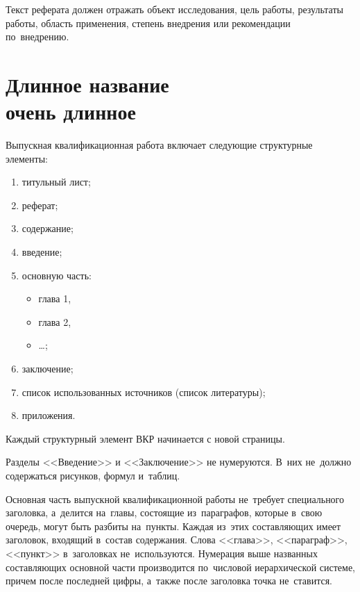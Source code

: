 \documentclass[a4paper,12pt]{diplom}
\begin{document}
Текст реферата должен отражать объект исследования, цель работы, результаты работы, область применения, степень внедрения или рекомендации по~внедрению.

\tableofcontents[Содержание]


\chapter[Длинное название очень длинное]{Длинное название \\ очень длинное}





Выпускная квалификационная работа включает следующие структурные элементы:
\begin{enumerate}[label=\arabic{enumi})]
	\item титульный лист;
	\item реферат;
	\item содержание;
	\item введение;
	\item основную часть:
	\begin{itemize}
		\item глава 1,
		\item глава 2,
		\item \dots;
	\end{itemize}
	\item заключение;
	\item список использованных источников (список литературы);
	\item приложения.
\end{enumerate}
Каждый структурный элемент ВКР начинается с новой страницы.

Разделы <<Введение>> и <<Заключение>> не нумеруются. 
В~них не~должно содержаться рисунков, формул и~таблиц.

Основная часть выпускной квалификационной работы не~требует специального заголовка, а~делится на~главы, состоящие из~параграфов, которые в~свою очередь, могут быть разбиты на~пункты. Каждая из~этих составляющих имеет заголовок, входящий в~состав содержания. Слова <<глава>>, <<параграф>>, <<пункт>> в~заголовках не~используются.  
Нумерация выше названных составляющих основной части производится по~числовой иерархической системе, причем после последней цифры, а~также после заголовка точка не~ставится.
\end{document}
